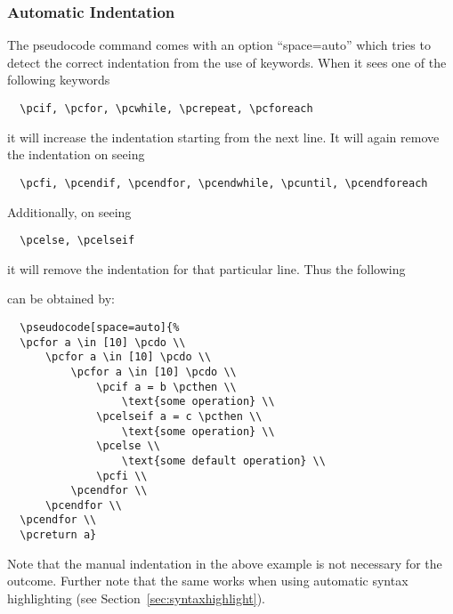\documentclass[a4paper]{report}
\begin{document}
  \subsubsection{Automatic Indentation}
  The pseudocode command comes with an option \enquote{space=auto} which tries to detect the correct indentation from the use of
  keywords. When it sees one of the following keywords
  \begin{lstlisting}
  \pcif, \pcfor, \pcwhile, \pcrepeat, \pcforeach
  \end{lstlisting}
  it will increase the indentation starting from the next line. It will again remove the indentation on seeing 
  \begin{lstlisting}
  \pcfi, \pcendif, \pcendfor, \pcendwhile, \pcuntil, \pcendforeach
  \end{lstlisting}
  Additionally, on seeing
  \begin{lstlisting}
  \pcelse, \pcelseif
  \end{lstlisting}
  it will remove the indentation for that particular line. Thus the following 
  \begin{center}
  \end{center}
  can be obtained by:
  \begin{lstlisting}
  \pseudocode[space=auto]{%
  \pcfor a \in [10] \pcdo \\
	  \pcfor a \in [10] \pcdo \\
		  \pcfor a \in [10] \pcdo \\
			  \pcif a = b \pcthen \\
				  \text{some operation} \\
			  \pcelseif a = c \pcthen \\
				  \text{some operation} \\
			  \pcelse \\
				  \text{some default operation} \\
			  \pcfi \\
		  \pcendfor \\
	  \pcendfor \\
  \pcendfor \\
  \pcreturn a}
  \end{lstlisting}
  Note that the manual indentation in the above example is not necessary for the outcome. Further note that the same
  works when using automatic syntax highlighting (see Section~\ref{sec:syntaxhighlight}).
  
\end{document}
